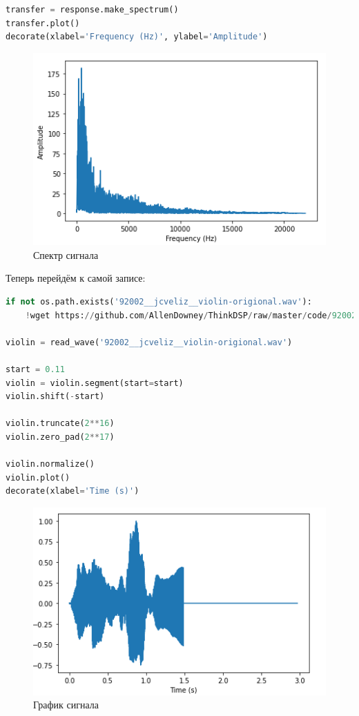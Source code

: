 \begin{lstlisting}[language=Python]
transfer = response.make_spectrum()
transfer.plot()
decorate(xlabel='Frequency (Hz)', ylabel='Amplitude')
\end{lstlisting}

\begin{figure}[H]
	\begin{center}
		\includegraphics[scale=1]{fig/lab10/lab10_02.png}
		\caption{Спектр сигнала}
	\end{center}
\end{figure}

Теперь перейдём к самой записе:

\begin{lstlisting}[language=Python]
if not os.path.exists('92002__jcveliz__violin-origional.wav'):
    !wget https://github.com/AllenDowney/ThinkDSP/raw/master/code/92002__jcveliz__violin-origional.wav
    
violin = read_wave('92002__jcveliz__violin-origional.wav')

start = 0.11
violin = violin.segment(start=start)
violin.shift(-start)

violin.truncate(2**16)
violin.zero_pad(2**17)

violin.normalize()
violin.plot()
decorate(xlabel='Time (s)')
\end{lstlisting}

\begin{figure}[H]
	\begin{center}
		\includegraphics[scale=1]{fig/lab10/lab10_03.png}
		\caption{График сигнала}
	\end{center}
\end{figure}

